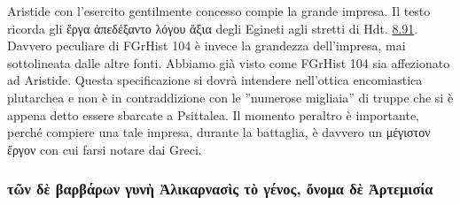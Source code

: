 {    Aristide con l'esercito gentilmente concesso compie la grande impresa. Il testo ricorda gli \textgreek{ἔργα ἀπεδέξαντο λόγου ἄξια} degli Egineti agli stretti di Hdt. \href{http://data.perseus.org/citations/urn:cts:greekLit:tlg0016.tlg001.perseus-grc1:8.91}{8.91}. 
    Davvero peculiare di FGrHist 104 è invece la grandezza dell'impresa, mai sottolineata dalle altre fonti. Abbiamo già visto come FGrHist 104 sia affezionato ad Aristide. Questa specificazione si dovrà intendere nell'ottica encomiastica plutarchea e non è in contraddizione con le ''numerose migliaia'' di truppe che si è appena detto essere sbarcate a Psittalea. Il momento peraltro è importante, perché compiere una tale impresa, durante la battaglia, è davvero un \textgreek{μέγιστον ἔργον} con cui farsi notare dai Greci.
\subsubsection{\textgreek{τῶν δὲ βαρβάρων γυνὴ Ἁλικαρνασὶς τὸ γένος, ὄνομα δὲ Ἀρτεμισία}} 
}
